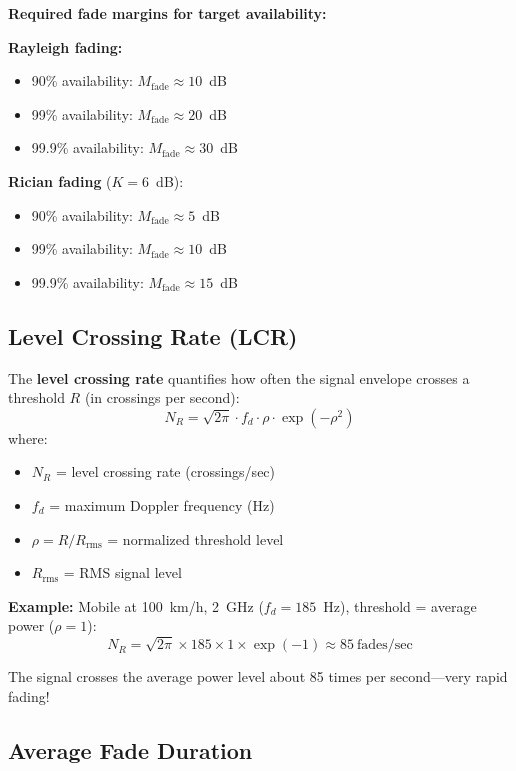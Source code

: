 \textbf{Required fade margins for target availability:}

\textbf{Rayleigh fading:}
\begin{itemize}
\item 90\% availability: $M_{\text{fade}} \approx 10$~dB
\item 99\% availability: $M_{\text{fade}} \approx 20$~dB
\item 99.9\% availability: $M_{\text{fade}} \approx 30$~dB
\end{itemize}

\textbf{Rician fading} ($K = 6$~dB):
\begin{itemize}
\item 90\% availability: $M_{\text{fade}} \approx 5$~dB
\item 99\% availability: $M_{\text{fade}} \approx 10$~dB
\item 99.9\% availability: $M_{\text{fade}} \approx 15$~dB
\end{itemize}

\subsection{Level Crossing Rate (LCR)}

The \textbf{level crossing rate} quantifies how often the signal envelope crosses a threshold $R$ (in crossings per second):
\begin{equation}
N_R = \sqrt{2\pi} \cdot f_d \cdot \rho \cdot \exp(-\rho^2)
\end{equation}
where:
\begin{itemize}
\item $N_R$ = level crossing rate (crossings/sec)
\item $f_d$ = maximum Doppler frequency (Hz)
\item $\rho = R/R_{\text{rms}}$ = normalized threshold level
\item $R_{\text{rms}}$ = RMS signal level
\end{itemize}

\textbf{Example:} Mobile at 100~km/h, 2~GHz ($f_d = 185$~Hz), threshold = average power ($\rho = 1$):
\begin{equation}
N_R = \sqrt{2\pi} \times 185 \times 1 \times \exp(-1) \approx 85~\text{fades/sec}
\end{equation}

The signal crosses the average power level about 85 times per second---very rapid fading!

\subsection{Average Fade Duration}

